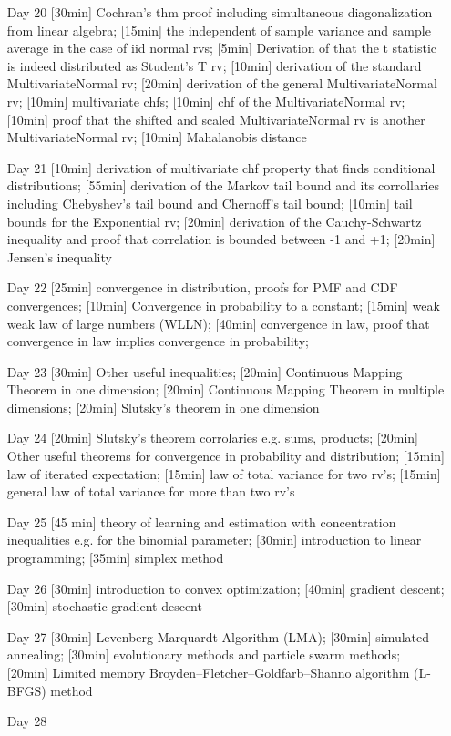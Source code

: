 \begin{enumerate}
\item[Day 20] [30min] Cochran's thm proof including simultaneous diagonalization from linear algebra; [15min] the independent of sample variance and sample average in the case of iid normal rvs; [5min] Derivation of that the t statistic is indeed distributed as Student's T rv; [10min] derivation of the standard MultivariateNormal rv; [20min] derivation of the general MultivariateNormal rv; [10min] multivariate chfs; [10min] chf of the MultivariateNormal rv; [10min] proof that the shifted and scaled MultivariateNormal rv is another MultivariateNormal rv; [10min] Mahalanobis distance

\item[Day 21] [10min] derivation of multivariate chf property that finds conditional distributions; [55min] derivation of the Markov tail bound and its corrollaries including Chebyshev's tail bound and Chernoff's tail bound; [10min] tail bounds for the Exponential rv; [20min] derivation of the Cauchy-Schwartz inequality and proof that correlation is bounded between -1 and +1; [20min] Jensen's inequality

\item[Day 22] [25min] convergence in distribution, proofs for PMF and CDF convergences; [10min] Convergence in probability to a constant; [15min] weak weak law of large numbers (WLLN); [40min] convergence in law, proof that convergence in law implies convergence in probability; 

\item[Day 23] [30min] Other useful inequalities; [20min] Continuous Mapping Theorem in one dimension; [20min] Continuous Mapping Theorem in multiple dimensions; [20min] Slutsky's theorem in one dimension

\item[Day 24] [20min] Slutsky's theorem corrolaries e.g. sums, products; [20min] Other useful theorems for convergence in probability and distribution; [15min] law of iterated expectation; [15min] law of total variance for two rv's; [15min] general law of total variance for more than two rv's

\item[Day 25] [45 min] theory of learning and estimation with concentration inequalities e.g. for the binomial parameter; [30min] introduction to linear programming; [35min] simplex method

\item[Day 26] [30min] introduction to convex optimization; [40min] gradient descent; [30min] stochastic gradient descent

\item[Day 27] [30min] Levenberg-Marquardt Algorithm (LMA); [30min] simulated annealing; [30min] evolutionary methods and particle swarm methods; [20min] Limited memory Broyden–Fletcher–Goldfarb–Shanno algorithm (L-BFGS) method

\item[Day 28] 

\end{enumerate}